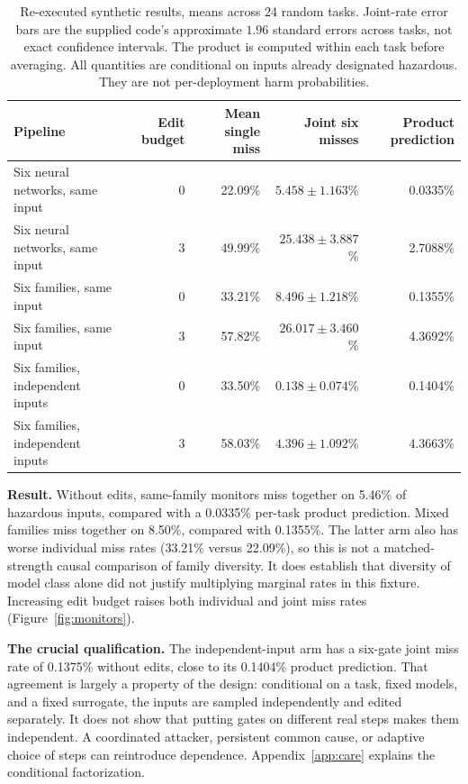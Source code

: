 \documentclass[10pt,twocolumn,letterpaper]{article}
\newcommand{\para}[1]{\smallskip\noindent\textbf{#1}\enspace}
\begin{document}
\begin{table}[t]
\centering\small
\begin{tabularx}{\textwidth}{@{}Lrrrr@{}}
\toprule
\textbf{Pipeline} & \textbf{Edit budget} & \textbf{Mean single miss} & \textbf{Joint six misses} & \textbf{Product prediction}\\
\midrule
Six neural networks, same input & 0 & 22.09\% & $5.458\pm1.163$\% & 0.0335\%\\
Six neural networks, same input & 3 & 49.99\% & $25.438\pm3.887$\% & 2.7088\%\\
Six families, same input & 0 & 33.21\% & $8.496\pm1.218$\% & 0.1355\%\\
Six families, same input & 3 & 57.82\% & $26.017\pm3.460$\% & 4.3692\%\\
Six families, independent inputs & 0 & 33.50\% & $0.138\pm0.074$\% & 0.1404\%\\
Six families, independent inputs & 3 & 58.03\% & $4.396\pm1.092$\% & 4.3663\%\\
\bottomrule
\end{tabularx}
\caption{Re-executed synthetic results, means across 24 random tasks. Joint-rate error bars are the supplied code's approximate $1.96$ standard errors across tasks, not exact confidence intervals. The product is computed within each task before averaging. All quantities are conditional on inputs already designated hazardous. They are not per-deployment harm probabilities.}
\label{tab:monitors}
\end{table}

\para{Result.} Without edits, same-family monitors miss together on 5.46\% of hazardous inputs, compared with a 0.0335\% per-task product prediction. Mixed families miss together on 8.50\%, compared with 0.1355\%. The latter arm also has worse individual miss rates (33.21\% versus 22.09\%), so this is not a matched-strength causal comparison of family diversity. It does establish that diversity of model class alone did not justify multiplying marginal rates in this fixture. Increasing edit budget raises both individual and joint miss rates (Figure~\ref{fig:monitors}).

\para{The crucial qualification.} The independent-input arm has a six-gate joint miss rate of 0.1375\% without edits, close to its 0.1404\% product prediction. That agreement is largely a property of the design: conditional on a task, fixed models, and a fixed surrogate, the inputs are sampled independently and edited separately. It does not show that putting gates on different real steps makes them independent. A coordinated attacker, persistent common cause, or adaptive choice of steps can reintroduce dependence. Appendix~\ref{app:care} explains the conditional factorization.
\end{document}
